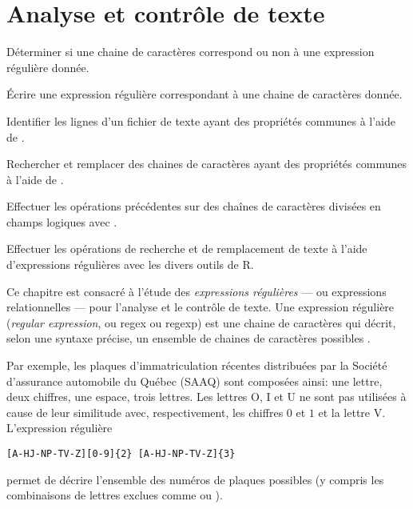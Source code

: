 
\chapter{Analyse et contrôle de texte}
\label{chap:texte}

\begin{objectifs}
\item Déterminer si une chaine de caractères correspond ou non à une
  expression régulière donnée.
\item Écrire une expression régulière correspondant à une chaine de
  caractères donnée.
\item Identifier les lignes d'un fichier de texte ayant des propriétés
  communes à l'aide de .
\item Rechercher et remplacer des chaines de caractères ayant des
  propriétés communes à l'aide de .
\item Effectuer les opérations précédentes sur des chaînes de
  caractères divisées en champs logiques avec .
\item Effectuer les opérations de recherche et de remplacement de
  texte à l'aide d'expressions régulières avec les divers outils de R.
\end{objectifs}


Ce chapitre est consacré à l'étude des \emph{expressions régulières}
--- ou expressions relationnelles --- pour l'analyse et le contrôle de
texte. Une expression régulière (\emph{regular expression}, ou regex
ou regexp) est une chaine de caractères qui décrit, selon une syntaxe
précise, un ensemble de chaines de caractères possibles
\citep{Wikipedia:Expression_reguliere}.

Par exemple, les plaques d'immatriculation récentes distribuées par la
Société d'assurance automobile du Québec (SAAQ) sont composées ainsi:
une lettre, deux chiffres, une espace, trois lettres. Les lettres
\textsf{O}, \textsf{I} et \textsf{U} ne sont pas utilisées à cause de
leur similitude avec, respectivement, les chiffres $0$ et $1$ et la
lettre \textsf{V}. L'expression régulière
\begin{Schunk}
\begin{Verbatim}
[A-HJ-NP-TV-Z][0-9]{2} [A-HJ-NP-TV-Z]{3}
\end{Verbatim}
\end{Schunk}
permet de décrire
l'ensemble des numéros de plaques possibles (y compris les
combinaisons de lettres exclues comme  ou ).

